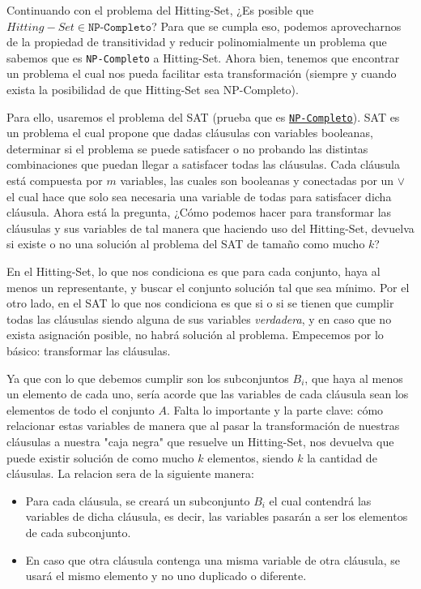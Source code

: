 Continuando con el problema del Hitting-Set, ¿Es posible que $Hitting-Set \in \texttt{NP-Completo}$?
Para que se cumpla eso, podemos aprovecharnos de la propiedad de transitividad y reducir polinomialmente un problema que sabemos que es \texttt{NP-Completo} a Hitting-Set. Ahora bien, tenemos que encontrar un problema el cual nos pueda facilitar esta transformación (siempre y cuando exista la posibilidad de que Hitting-Set sea NP-Completo).

Para ello, usaremos el problema del SAT (prueba que es \href{https://www.geeksforgeeks.org/proof-that-sat-is-np-complete/}{\texttt{NP-Completo}}). SAT es un problema el cual propone que dadas cláusulas con variables booleanas, determinar si el problema se puede satisfacer o no probando las distintas combinaciones que puedan llegar a satisfacer todas las cláusulas. Cada cláusula está compuesta por $m$ variables, las cuales son booleanas y conectadas por un $\lor$ el cual hace que solo sea necesaria una variable de todas para satisfacer dicha cláusula. Ahora está la pregunta, ¿Cómo podemos hacer para transformar las cláusulas y sus variables de tal manera que haciendo uso del Hitting-Set, devuelva si existe o no una solución al problema del SAT de tamaño como mucho $k$?

En el Hitting-Set, lo que nos condiciona es que para cada conjunto, haya al menos un representante, y buscar el conjunto solución tal que sea mínimo. Por el otro lado, en el SAT lo que nos condiciona es que si o si se tienen que cumplir todas las cláusulas siendo alguna de sus variables \textit{verdadera}, y en caso que no exista asignación posible, no habrá solución al problema. Empecemos por lo básico: transformar las cláusulas.

Ya que con lo que debemos cumplir son los subconjuntos $B_i$, que haya al menos un elemento de cada uno, sería acorde que las variables de cada cláusula sean los elementos de todo el conjunto $A$. Falta lo importante y la parte clave: cómo relacionar estas variables de manera que al pasar la transformación de nuestras cláusulas a nuestra "caja negra" que resuelve un Hitting-Set, nos devuelva que puede existir solución de como mucho $k$ elementos, siendo $k$ la cantidad de cláusulas. La relacion sera de la siguiente manera:
\begin{itemize}
	\item Para cada cláusula, se creará un subconjunto $B_i$ el cual contendrá las variables de dicha cláusula, es decir, las variables pasarán a ser los elementos de cada subconjunto.
	\item En caso que otra cláusula contenga una misma variable de otra cláusula, se usará el mismo elemento y no uno duplicado o diferente.
\end{itemize}

